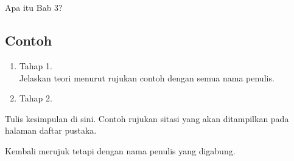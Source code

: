 \chapter{\babTiga}
Apa itu Bab 3?


\section{Contoh}
\begin{enumerate}
	\item Tahap 1. \\ %
	Jelaskan teori menurut rujukan contoh \citep*{sahroni2018fikih} dengan semua nama penulis.

	\lipsum[6-8]

	\item Tahap 2.
\end{enumerate}

Tulis kesimpulan di sini. Contoh rujukan sitasi \citep{UINJAKARTARoikhan2017} yang akan
ditampilkan pada halaman daftar pustaka.

Kembali merujuk \citep{sahroni2018fikih} tetapi dengan nama penulis yang digabung.
